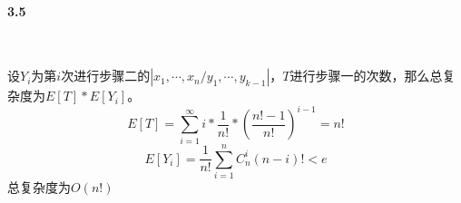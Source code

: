 \paragraph{3.5}~{}

设$Y_i$为第$i$次进行步骤二的$|{x_1,\cdots,x_n}/{y_1,\cdots,y_{k-1}}|$，$T$进行步骤一的次数，那么总复杂度为$E[T]*E[Y_i]$。
$$E[T] = \sum_{i=1}^{\infty} i*\frac{1}{n!}*(\frac{n!-1}{n!})^{i-1}=n!$$
$$E[Y_i] = \frac{1}{n!} \sum_{i=1}^n C_n^i (n-i)! < e$$
总复杂度为$O(n!)$